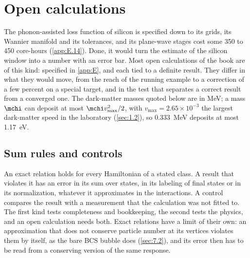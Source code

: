 \section{Open calculations}\label{sec:22.1}

The phonon-assisted loss function of silicon is specified down to its grids, its Wannier manifold and its tolerances, and its plane-wave stages cost some 350 to 450 core-hours (\cref{app:E.14}). Done, it would turn the estimate of the silicon window into a number with an error bar. Most open calculations of the book are of this kind: specified in \cref{app:E}, and each tied to a definite result. They differ in what they would move, from the reach of the running example to a correction of a few percent on a special target, and in the test that separates a correct result from a converged one. The dark-matter masses quoted below are in MeV; a mass $\mchi$ can deposit at most $\mchi v_{\mathrm{max}}^2/2$, with $v_{\mathrm{max}} = 2.65\times10^{-3}$ the largest dark-matter speed in the laboratory (\cref{sec:1.2}), so \SI{0.333}{MeV} deposits at most \SI{1.17}{eV}.

\subsection{Sum rules and controls}\label{sec:22.1-checks}

An exact relation holds for every Hamiltonian of a stated class. A result that violates it has an error in its sum over states, in its labeling of final states or in its normalization, whatever it approximates in the interactions. A control compares the result with a measurement that the calculation was not fitted to. The first kind tests completeness and bookkeeping, the second tests the physics, and an open calculation needs both. Exact relations have a limit of their own: an approximation that does not conserve particle number at its vertices violates them by itself, as the bare BCS bubble does (\cref{sec:7.2}), and its error then has to be read from a conserving version of the same response.


